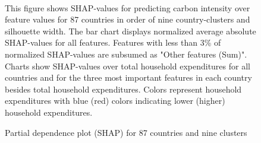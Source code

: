 \begin{figure}[ht!]
\begin{subfigure}[b]{\textwidth}
    \end{subfigure}
    \\
    \vspace{0.5cm}
        \caption{Partial dependence plot (SHAP) for 87 countries and nine clusters}
        \label{fig:5b}
    \begin{subcaption2}
     This figure shows SHAP-values for predicting carbon intensity over feature values for 87 countries in order of nine country-clusters and silhouette width. The bar chart displays normalized average absolute SHAP-values for all features. Features with less than 3\% of normalized SHAP-values are subsumed as "Other features (Sum)". Charts show SHAP-values over total household expenditures for all countries and for the three most important features in each country besides total household expenditures. Colors represent household expenditures with blue (red) colors indicating lower (higher) household expenditures.
     \end{subcaption2}
\end{figure}